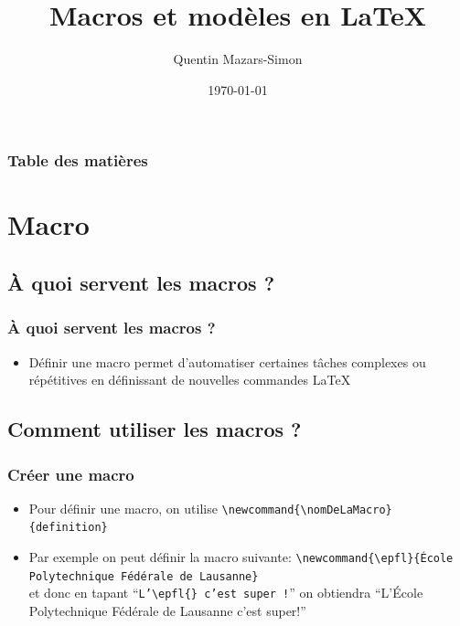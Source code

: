 \documentclass{clic_latex_beamer}
\newcommand{\epfl}{École Polytechnique Fédérale de Lausanne}
\begin{document}
\title{Macros et modèles en \LaTeX}
\author{Quentin Mazars-Simon}
\date{\today}
\titlegraphic{\ccbysa}

\frame{\titlepage}


\begin{frame}
\frametitle{Table des matières}
\tableofcontents[]
\end{frame}


\section{Macro}
\subsection{À quoi servent les macros ?}
\begin{frame}
\frametitle{À quoi servent les macros ?}
    \begin{itemize}
    \item Définir une macro permet d'automatiser certaines tâches complexes ou répétitives en définissant de nouvelles commandes \LaTeX
    \end{itemize}
 \end{frame}
 
 \subsection{Comment utiliser les macros ?}
 \begin{frame}
\frametitle{Créer une macro}
    \begin{itemize}
    \item Pour définir une macro, on utilise \texttt{\textbackslash newcommand\{\textbackslash nomDeLaMacro\}\{definition\}} 
    \item Par exemple on peut définir la macro suivante: \texttt{\small\textbackslash newcommand\{\textbackslash epfl\}\{École Polytechnique Fédérale de Lausanne\}}\\ et donc en tapant ``\texttt{L'\textbackslash epfl\{\} c'est super !}'' on obtiendra ``L'\epfl{} c'est super!''

    \end{itemize}

 \end{frame}
 
\end{document}
